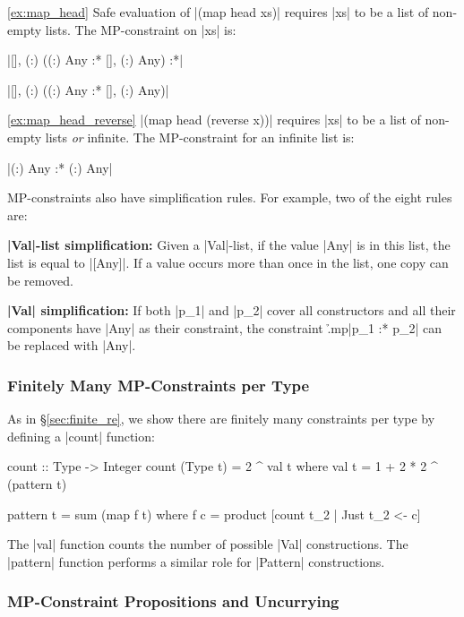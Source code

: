 \documentclass[preprint]{sigplanconf}
\newcommand{\para}[1]{\vspace{2mm}\noindent\textbf{#1}}
\begin{document}
\begin{examplerevisit}{\ref{ex:map_head}} Safe evaluation of |(map head xs)| requires |xs| to be a list of non-empty lists. The MP-constraint on |xs| is:

\smallskip
\par\noindent \ignore|{[], (:) ({(:) Any} :* {[], (:) Any})} :*|
\par\noindent \ignore|{[], (:) ({(:) Any} :* {[], (:) Any})}|
\end{examplerevisit}

\begin{examplerevisit}{\ref{ex:map_head_reverse}} |(map head (reverse x))| requires |xs| to be a list of non-empty lists \textit{or} infinite. The MP-constraint for an infinite list is: \ignore|{(:) Any} :* {(:) Any}|
\end{examplerevisit}

\bigskip

MP-constraints also have simplification rules.  For example, two of the eight rules are:

\para{|Val|-list simplification:} Given a |Val|-list, if the value |Any| is in this list, the list is equal to |[Any]|. If a value occurs more than once in the list, one copy can be removed.

\para{|Val| simplification:} If both |p_1| and |p_2| cover all constructors and all their components have |Any| as their constraint, the constraint \h{.mp}|p_1 :* p_2| can be replaced with |Any|.


\subsubsection{Finitely Many MP-Constraints per Type}

As in \S\ref{sec:finite_re}, we show there are finitely many constraints per type by defining a |count| function:

\begin{code}
count :: Type -> Integer
count (Type t) = 2 ^ val t
    where val t = 1 + 2 * 2 ^ (pattern t)

pattern t = sum (map f t)
    where f c = product [count t_2 | Just t_2 <- c]
\end{code}

The |val| function counts the number of possible |Val| constructions. The |pattern| function performs a similar role for |Pattern| constructions.


\subsubsection{MP-Constraint Propositions and Uncurrying}
\end{document}
